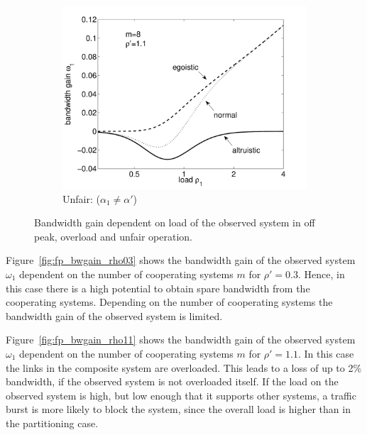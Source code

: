 \begin{figure}[tb]
\begin{subfigure}{.32\textwidth}
  \centering
\includegraphics[width=\linewidth]{aggregation/performance_model/figures/fp_bwgain_prio11}
  	\caption{Unfair: ($\alpha_1 \neq \alpha'$)}
  	\label{fig:fp_bwgain_prio11}
\end{subfigure}
\caption{Bandwidth gain dependent on load of the observed system in off peak, overload and unfair operation.}
\label{fig:m82}
\end{figure}

Figure~\ref{fig:fp_bwgain_rho03} shows the bandwidth gain of the observed system $\omega_1$ dependent on the number of cooperating systems $m$ for $\rho'=0.3$.
Hence, in this case there is a high potential to obtain spare bandwidth from the cooperating systems.
Depending on the number of cooperating systems the bandwidth gain of the observed system is limited.

Figure~\ref{fig:fp_bwgain_rho11} shows the bandwidth gain of the observed system $\omega_1$ dependent on the number of cooperating systems $m$ for $\rho'=1.1$.
In this case the links in the composite system are overloaded.
This leads to a loss of up to 2\% bandwidth, if the observed system is not overloaded itself.
If the load on the observed system is high, but low enough that it supports other systems, a traffic burst is more likely to block the system, since the overall load is higher than in the partitioning case.

